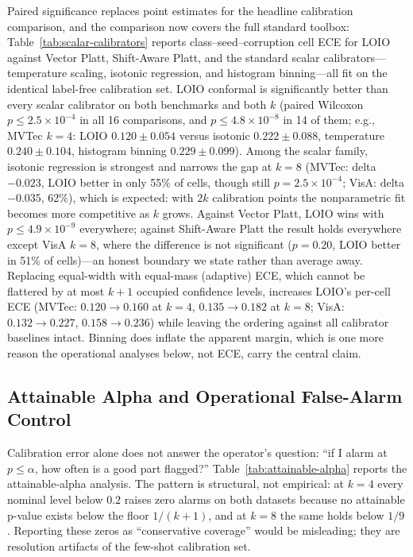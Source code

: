 
Paired significance replaces point estimates for the headline calibration comparison, and the comparison now covers the full standard toolbox: Table~\ref{tab:scalar-calibrators} reports class--seed--corruption cell ECE for LOIO against Vector Platt, Shift-Aware Platt, and the standard scalar calibrators---temperature scaling, isotonic regression, and histogram binning---all fit on the identical label-free calibration set. LOIO conformal is significantly better than every scalar calibrator on both benchmarks and both $k$ (paired Wilcoxon $p\le2.5\times10^{-4}$ in all 16 comparisons, and $p\le4.8\times10^{-8}$ in 14 of them; e.g., MVTec $k{=}4$: LOIO $0.120\pm0.054$ versus isotonic $0.222\pm0.088$, temperature $0.240\pm0.104$, histogram binning $0.229\pm0.099$). Among the scalar family, isotonic regression is strongest and narrows the gap at $k{=}8$ (MVTec: delta $-0.023$, LOIO better in only 55\% of cells, though still $p{=}2.5\times10^{-4}$; VisA: delta $-0.035$, 62\%), which is expected: with $2k$ calibration points the nonparametric fit becomes more competitive as $k$ grows. Against Vector Platt, LOIO wins with $p\le4.9\times10^{-9}$ everywhere; against Shift-Aware Platt the result holds everywhere except VisA $k{=}8$, where the difference is not significant ($p{=}0.20$, LOIO better in 51\% of cells)---an honest boundary we state rather than average away. Replacing equal-width with equal-mass (adaptive) ECE, which cannot be flattered by at most $k{+}1$ occupied confidence levels, increases LOIO's per-cell ECE (MVTec: $0.120\to0.160$ at $k{=}4$, $0.135\to0.182$ at $k{=}8$; VisA: $0.132\to0.227$, $0.158\to0.236$) while leaving the ordering against all calibrator baselines intact. Binning does inflate the apparent margin, which is one more reason the operational analyses below, not ECE, carry the central claim.

\subsection{Attainable Alpha and Operational False-Alarm Control}

Calibration error alone does not answer the operator's question: ``if I alarm at $p\le\alpha$, how often is a good part flagged?'' Table~\ref{tab:attainable-alpha} reports the attainable-alpha analysis. The pattern is structural, not empirical: at $k{=}4$ every nominal level below $0.2$ raises zero alarms on both datasets because no attainable p-value exists below the floor $1/(k{+}1)$, and at $k{=}8$ the same holds below $1/9$. Reporting these zeros as ``conservative coverage'' would be misleading; they are resolution artifacts of the few-shot calibration set.

